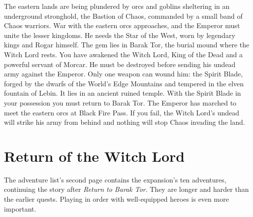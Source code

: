 The eastern lands are being plundered by orcs and goblins sheltering in an underground stronghold, the Bastion of Chaos, commanded by a small band of Chaos warriors.
War with the eastern orcs approaches, and the Emperor must unite the lesser kingdoms. He needs the Star of the West, worn by legendary kings and Rogar himself. The gem lies in Barak Tor, the burial mound where the Witch Lord rests.
You have awakened the Witch Lord, King of the Dead and a powerful servant of Morcar. He must be destroyed before sending his undead army against the Emperor. Only one weapon can wound him: the Spirit Blade, forged by the dwarfs of the World's Edge Mountains and tempered in the elven fountain of Lebin. It lies in an ancient ruined temple.
With the Spirit Blade in your possession you must return to Barak Tor. The Emperor has marched to meet the eastern orcs at Black Fire Pass. If you fail, the Witch Lord's undead will strike his army from behind and nothing will stop Chaos invading the land.

\chapter{Return of the Witch Lord}
The adventure list's second page contains the expansion's ten adventures, continuing the story after \textit{Return to Barak Tor}. They are longer and harder than the earlier quests. Playing in order with well-equipped heroes is even more important.
